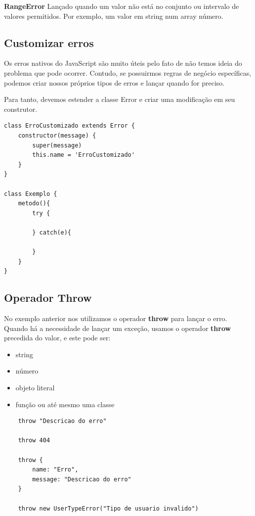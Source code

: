 \textbf{RangeError}
Lançado quando um valor não está no conjunto ou intervalo de valores permitidos. Por exemplo, um valor em string num array número.

\subsection{Customizar erros}
Os erros nativos do JavaScript são muito úteis pelo fato de não temos ideia do problema que pode ocorrer. Contudo, se possuirmos regras de negócio específicas, podemos criar nossos próprios tipos de erros e lançar quando for preciso.

Para tanto, devemos estender a classe Error e criar uma modificação em seu construtor.

\begin{verbatim}
class ErroCustomizado extends Error {
	constructor(message) {
		super(message)
		this.name = 'ErroCustomizado'
	}
}

class Exemplo {
	metodo(){
		try {
		
		} catch(e){
			
		}
	}
}
\end{verbatim}

\subsection{Operador Throw}
No exemplo anterior nos utilizamos o operador \textbf{throw} para lançar o erro. Quando há a necessidade de lançar um exceção, usamos o operador \textbf{throw} precedida do valor, e este pode ser:

\begin{itemize}
	\item string
	\item número
	\item objeto literal
	\item função ou até mesmo uma classe
\end{itemize}

\begin{verbatim}
	throw "Descricao do erro"
	
	throw 404
	
	throw {
		name: "Erro",
		message: "Descricao do erro"
	}
	
	throw new UserTypeError("Tipo de usuario invalido")
\end{verbatim}

